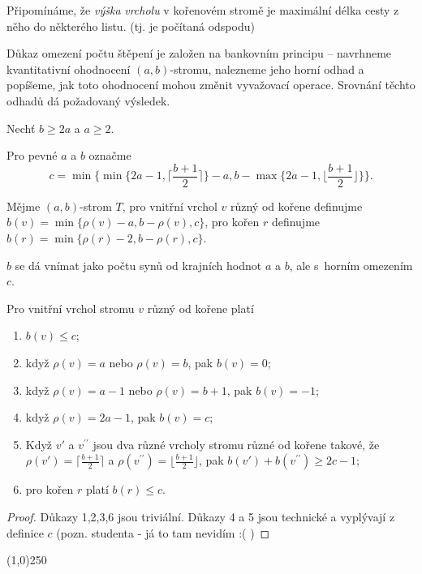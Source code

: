 \documentclass[a4paper,12pt]{article}
\newenvironment{myproof}{
  \begin{proof}
    
  }{
  \end{proof}
  \begin{center}
   \line(1,0){250}
   \end{center}
  }
\begin{document}
Připomínáme, že \emph{výška} \emph{vrcholu} v kořenovém stromě je 
maximální délka cesty z něho do některého listu. (tj. je počítaná odspodu)

Důkaz omezení počtu štěpení je založen na bankovním principu -- 
navrhneme kvantitativní ohodnocení $(a,b)$-stromu, 
nalezneme jeho horní odhad a popíšeme, jak 
toto ohodnocení mohou změnit vyvažo\-vací ope\-race. Srovnání 
těchto odhadů dá požadovaný výsledek.

Nechť $b\ge 2a$ a $a\ge 2$. 


\begin{definice}
Pro pevné $a$ a $b$ označme 
$$c=\min\{\min\{2a-1,\lceil\frac {b+1}2\rceil \}-a,b-\max\{2a-1,\lfloor\frac {
b+1}2\rfloor \}\}.$$
\end{definice}

\begin{definice}Mějme $(a,b)$-strom $T$, pro vnitřní vrchol 
$v$ různý od kořene definuj\-me 
$b(v)=\min\{\rho (v)-a,b-\rho (v),c\}$, pro 
kořen $r$ definuj\-me $b(r)=\min\{\rho (r)-2,b-\rho (r),c\}$.
\end{definice}

$b$ se dá vnímat jako  počtu synů od krajních hodnot $a$ a $b$, ale s~horním omezením $c$.

\begin{pozorovani}[1]Pro vnitřní vrchol stromu $v$  
různý od kořene platí
\begin{enumerate}
\item
$b(v)\le c$;
\item
když $\rho (v)=a$ nebo $\rho (v)=b$, pak $b(v)=0$;
\item
když $\rho (v)=a-1$ nebo $\rho (v)=b+1$, pak $b(v)=-1$;
\item
když $\rho (v)=2a-1$, pak $b(v)=c$;
\item
Když $v'$ a $v^{\prime\prime}$ jsou dva různé vrcholy stromu 
různé od kořene takové, že $\rho (v')=\lceil\frac {
b+1}2\rceil$ a 
$\rho (v^{\prime\prime})=\lfloor\frac {b+1}2\rfloor$, pak $b(v')+
b(v^{\prime\prime})\ge 2c-1$;
\item
pro kořen $r$ platí $b(r)\le c$.
\end{enumerate}
\end{pozorovani}


\begin{myproof}
    Důkazy 1,2,3,6 jsou triviální. Důkazy 4 a 5 jsou technické a vyplývají z definice $c$ (pozn. studenta - já to tam nevidím :( )
\end{myproof}
\end{document}
